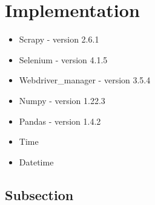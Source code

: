 \documentclass[main]{subfiles}
\begin{document}
\section{Implementation}
\begin{itemize}
    \item Scrapy -  version 2.6.1
    \item Selenium - version 4.1.5
    \item Webdriver\_manager - version 3.5.4
    \item Numpy -  version 1.22.3
    \item Pandas  - version 1.4.2
    \item Time
    \item Datetime
\end{itemize}

\subsection{Subsection}
\end{document}
